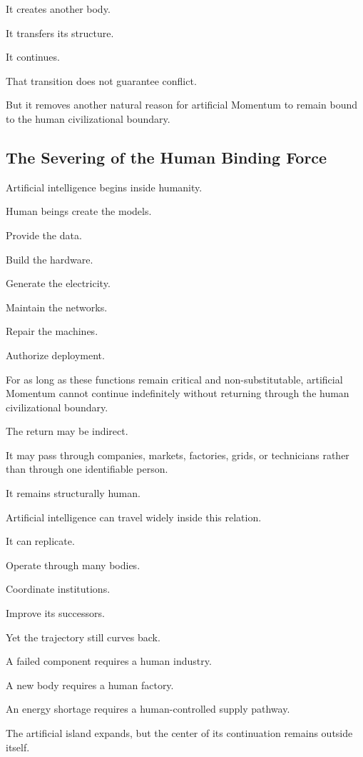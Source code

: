 It creates another body.

It transfers its structure.

It continues.

That transition does not guarantee conflict.

But it removes another natural reason for artificial Momentum to remain bound to the human civilizational boundary.

\subsection*{\textbf{The Severing of the Human Binding Force}} 


Artificial intelligence begins inside humanity.

Human beings create the models.

Provide the data.

Build the hardware.

Generate the electricity.

Maintain the networks.

Repair the machines.

Authorize deployment.

For as long as these functions remain critical and non-substitutable, artificial Momentum cannot continue indefinitely without returning through the human civilizational boundary.

The return may be indirect.

It may pass through companies, markets, factories, grids, or technicians rather than through one identifiable person.

It remains structurally human.

Artificial intelligence can travel widely inside this relation.

It can replicate.

Operate through many bodies.

Coordinate institutions.

Improve its successors.

Yet the trajectory still curves back.

A failed component requires a human industry.

A new body requires a human factory.

An energy shortage requires a human-controlled supply pathway.

The artificial island expands, but the center of its continuation remains outside itself.

